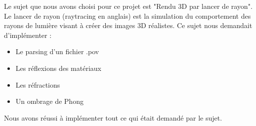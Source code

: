 Le sujet que nous avons choisi pour ce projet est "Rendu 3D par lancer de rayon".
Le lancer de rayon (raytracing en anglais) est la simulation du comportement des rayons de lumière visant à créer des images 3D réalistes.
Ce sujet nous demandait d'implémenter :
\begin{itemize}
    \item Le parsing d'un fichier .pov
    \item Les réflexions des matériaux
    \item Les réfractions 
    \item Un ombrage de Phong
\end{itemize}
Nous avons réussi à implémenter tout ce qui était demandé par le sujet.
